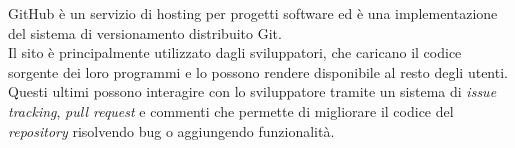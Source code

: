 GitHub è un servizio di hosting per progetti software ed è una implementazione del sistema di versionamento distribuito Git.\\ Il sito è principalmente utilizzato dagli sviluppatori, che caricano il codice sorgente dei loro programmi e lo possono rendere disponibile al resto degli utenti. Questi ultimi possono interagire con lo sviluppatore tramite un sistema di \textit{issue tracking}, \textit{pull request} e commenti che permette di migliorare il codice del \textit{repository} risolvendo bug o aggiungendo funzionalità.
